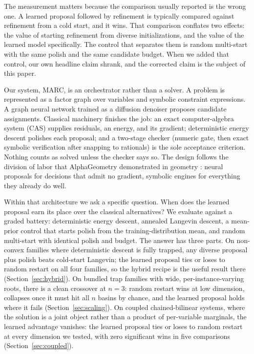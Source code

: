 \documentclass[11pt]{article}
\begin{document}
The measurement matters because the comparison usually reported is the wrong one. A learned
proposal followed by refinement is typically compared against refinement from a cold start,
and it wins. That comparison conflates two effects: the value of starting refinement from
diverse initializations, and the value of the learned model specifically. The control that
separates them is random multi-start with the same polish and the same candidate budget. When
we added that control, our own headline claim shrank, and the corrected claim is the subject
of this paper.

Our system, MARC, is an orchestrator rather than a solver. A problem is represented as a
factor graph over variables and symbolic constraint expressions. A graph neural network
trained as a diffusion denoiser proposes candidate assignments. Classical machinery finishes
the job: an exact computer-algebra system (CAS) supplies residuals, an energy, and its
gradient; deterministic energy descent polishes each proposal; and a two-stage checker
(numeric gate, then exact symbolic verification after snapping to rationals) is the sole
acceptance criterion. Nothing counts as solved unless the checker says so. The design follows
the division of labor that AlphaGeometry demonstrated in geometry \citep{trinh2024alphageometry}:
neural proposals for decisions that admit no gradient, symbolic engines for everything they
already do well.

Within that architecture we ask a specific question. When does the learned proposal earn its
place over the classical alternatives? We evaluate against a graded battery: deterministic
energy descent, annealed Langevin descent, a mean-prior control that starts polish from the
training-distribution mean, and random multi-start with identical polish and budget. The
answer has three parts. On non-convex families where deterministic descent is fully trapped,
any diverse proposal plus polish beats cold-start Langevin; the learned proposal ties or loses
to random restart on all four families, so the hybrid recipe is the useful result there
(Section~\ref{sec:hybrid}). On bundled trap families with wide, per-instance-varying roots,
there is a clean crossover at $n = 3$: random restart wins at low dimension, collapses once it
must hit all $n$ basins by chance, and the learned proposal holds where it fails
(Section~\ref{sec:scaling}). On coupled chained-bilinear systems, where the solution is a
joint object rather than a product of per-variable marginals, the learned advantage vanishes:
the learned proposal ties or loses to random restart at every dimension we tested, with zero
significant wins in five comparisons (Section~\ref{sec:coupled}).
\end{document}
